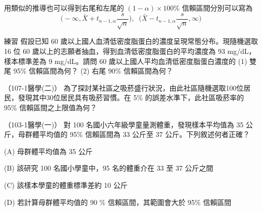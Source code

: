     用類似的推導也可以得到右尾和左尾的 $(1-\alpha)\times 100\%$ 信賴區間分別可以寫為
    \[\Big(-\infty,  \bar{X} + t_{n-1, \alpha}\frac{s}{\sqrt{n}}\Big), \;\;\Big(\bar{X}-t_{n-1, \alpha}\frac{s}{\sqrt{n}},  \infty\Big)\]

    \bigskip

    \begin{custom}{練習}
        假設已知 60 歲以上國人血清低密度脂蛋白的濃度呈現常態分布。現隨機選取 16 位 60 歲以上的志願者抽血，得到血清低密度脂蛋白的平均濃度為 93 mg/dL，樣本標準差為 9 mg/dL。請問 60 歲以上國人平均血清低密度脂蛋白濃度的 (1) 雙尾 95\% 信賴區間為何？ (2) 右尾 90\% 信賴區間為何？
    \end{custom}
    
    \begin{docexam}{（107-1醫學(二)）}
        為了探討某社區之吸菸盛行狀況，由此社區隨機選取100位居民，發現其中30位居民具有吸菸習慣。在 5\% 的誤差水準下，此社區吸菸率的 95\% 信賴區間之上限值為何？
    \end{docexam} 
    
    \begin{docexam}{（103-1醫學(一)）}
        對 100 名國小六年級學童量測體重，發現樣本平均值為 35 公斤，母群體平均值的 95\% 信賴區間為 33 公斤至 37 公斤。下列敘述何者正確？

        (A) 母群體平均值為 35 公斤

        (B) 該研究 100 名國小學童中，95 名的體重介在 33 至 37 公斤之間

        (C) 該樣本學童的體重標準差約 10 公斤

        (D) 若計算母群體平均值的 90 \% 信賴區間，其範圍會大於 95\% 信賴區間
    \end{docexam}